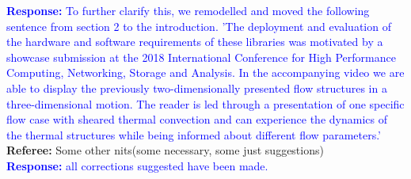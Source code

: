 \documentclass[]{article}
\begin{document}
\textcolor{blue}{\textbf{Response:} To further clarify this, we remodelled and moved the following sentence from section 2 to the introduction. 'The deployment and evaluation of the hardware and software requirements of these libraries was motivated by a showcase submission at the 2018 International Conference for High Performance Computing, Networking, Storage and Analysis. In the accompanying video \cite{fav18} we are able to display the previously two-dimensionally presented flow structures in a three-dimensional motion. The reader is led through a presentation of one specific flow case with sheared thermal convection and can experience the dynamics of the thermal structures while being informed about different flow parameters.' } \\

\textbf{Referee:} Some other nits(some necessary, some just suggestions) \\

\textcolor{blue}{\textbf{Response:} all corrections suggested have been made.} \\

 

\end{document}
